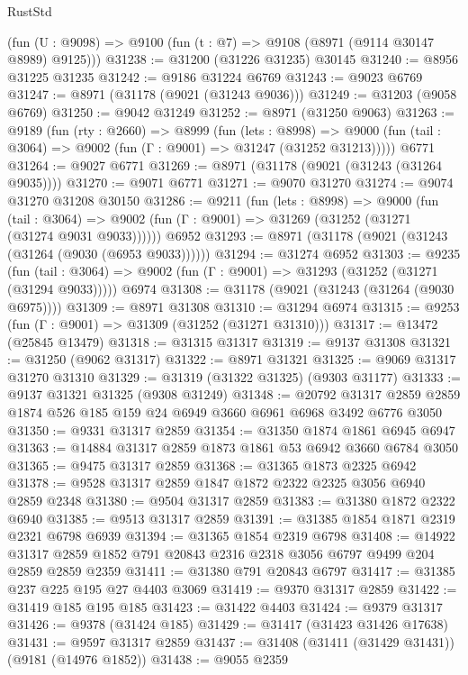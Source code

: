 \begin{lexlean}{RustStd}
\begin{coremodule}
    (fun (U : @9098) => @9100 (fun (t : @7) => @9108 (@8971 (@9114 @30147 @8989) @9125)))
@31238 := @31200 (@31226 @31235) @30145
@31240 := @8956 @31225 @31235
@31242 := @9186 @31224 @6769
@31243 := @9023 @6769
@31247 := @8971 (@31178 (@9021 (@31243 @9036)))
@31249 := @31203 (@9058 @6769)
@31250 := @9042 @31249
@31252 := @8971 (@31250 @9063)
@31263 := @9189
    (fun (rty : @2660) =>
    @8999
      (fun (lets : @8998) =>
      @9000 (fun (tail : @3064) => @9002 (fun (Γ : @9001) => @31247 (@31252 @31213)))))
    @6771
@31264 := @9027 @6771
@31269 := @8971 (@31178 (@9021 (@31243 (@31264 @9035))))
@31270 := @9071 @6771
@31271 := @9070 @31270
@31274 := @9074 @31270 @31208 @30150
@31286 := @9211
    (fun (lets : @8998) =>
    @9000
      (fun (tail : @3064) =>
      @9002 (fun (Γ : @9001) => @31269 (@31252 (@31271 (@31274 @9031 @9033))))))
    @6952
@31293 := @8971 (@31178 (@9021 (@31243 (@31264 (@9030 (@6953 @9033))))))
@31294 := @31274 @6952
@31303 := @9235
    (fun (tail : @3064) => @9002 (fun (Γ : @9001) => @31293 (@31252 (@31271 (@31294 @9033)))))
    @6974
@31308 := @31178 (@9021 (@31243 (@31264 (@9030 @6975))))
@31309 := @8971 @31308
@31310 := @31294 @6974
@31315 := @9253 (fun (Γ : @9001) => @31309 (@31252 (@31271 @31310)))
@31317 := @13472 (@25845 @13479)
@31318 := @31315 @31317
@31319 := @9137 @31308
@31321 := @31250 (@9062 @31317)
@31322 := @8971 @31321
@31325 := @9069 @31317 @31270 @31310
@31329 := @31319 (@31322 @31325) (@9303 @31177)
@31333 := @9137 @31321 @31325 (@9308 @31249)
@31348 := @20792
    @31317
    @2859
    @2859
    @1874
    @526
    @185
    @159
    @24
    @6949
    @3660
    @6961
    @6968
    @3492
    @6776
    @3050
@31350 := @9331 @31317 @2859
@31354 := @31350 @1874 @1861 @6945 @6947
@31363 := @14884 @31317 @2859 @1873 @1861 @53 @6942 @3660 @6784 @3050
@31365 := @9475 @31317 @2859
@31368 := @31365 @1873 @2325 @6942
@31378 := @9528 @31317 @2859 @1847 @1872 @2322 @2325 @3056 @6940 @2859 @2348
@31380 := @9504 @31317 @2859
@31383 := @31380 @1872 @2322 @6940
@31385 := @9513 @31317 @2859
@31391 := @31385 @1854 @1871 @2319 @2321 @6798 @6939
@31394 := @31365 @1854 @2319 @6798
@31408 := @14922 @31317 @2859 @1852 @791 @20843 @2316 @2318 @3056 @6797 @9499 @204 @2859 @2859 @2359
@31411 := @31380 @791 @20843 @6797
@31417 := @31385 @237 @225 @195 @27 @4403 @3069
@31419 := @9370 @31317 @2859
@31422 := @31419 @185 @195 @185
@31423 := @31422 @4403
@31424 := @9379 @31317
@31426 := @9378 (@31424 @185)
@31429 := @31417 (@31423 @31426 @17638)
@31431 := @9597 @31317 @2859
@31437 := @31408 (@31411 (@31429 @31431)) (@9181 (@14976 @1852))
@31438 := @9055 @2359

\end{coremodule}
\end{lexlean}
